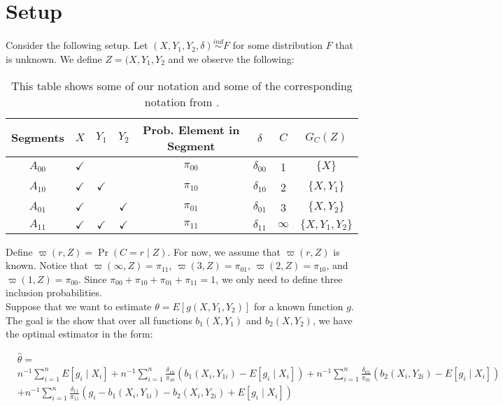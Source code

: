 \documentclass[12pt]{article}
\begin{document}
\rhead{\today}

\section*{Setup}

Consider the following setup. Let $(X, Y_1, Y_2, \delta)  \stackrel{ind}{\sim}
F$ for some distribution $F$ that is unknown. We define $Z = (X, Y_1, Y_2$ and
we observe the following:

\begin{table}[!ht]
  \centering
  \caption{This table shows some of our notation and some of the corresponding
  notation from \cite{tsiatis2006semiparametric}.}
\begin{tabular}{cccccccc}
  \toprule
  Segments & $X$ & $Y_1$ & $Y_2$ & Prob. Element in Segment & $\delta$ & $C$ & $G_C(Z)$ \\
  \midrule
  $A_{00}$ & $\checkmark$ &               &         & $\pi_{00}$ & $\delta_{00}$ & 1 & $\{X\}$ \\
  $A_{10}$ & $\checkmark$ & $\checkmark$  &         & $\pi_{10}$ & $\delta_{10}$ & 2 & $\{X, Y_1\}$ \\
  $A_{01}$ & $\checkmark$ &               & $\checkmark$ & $\pi_{01}$ & $\delta_{01}$ & 3 & $\{X, Y_2\}$ \\
  $A_{11}$ & $\checkmark$ & $\checkmark$  & $\checkmark$ & $\pi_{11}$ & $\delta_{11}$ & $\infty$ & $\{X, Y_1, Y_2\}$ \\
  \bottomrule
\end{tabular}
\end{table}

Define $\varpi(r, Z) = \Pr(C = r \mid Z)$. For now, we assume that $\varpi(r,
Z)$ is known. Notice that $\varpi(\infty, Z) = \pi_11$, $\varpi(3, Z) = \pi_{01}$,
$\varpi(2, Z) = \pi_{10}$, and $\varpi(1, Z) = \pi_{00}$. Since $\pi_{00} +
\pi_{10} + \pi_{01} + \pi_{11} = 1$, we only need to define three inclusion 
probabilities.\\

Suppose that we want to estimate $\theta = E[g(X, Y_1, Y_2)]$ for a known
function $g$. 
The goal is the show that over all functions $b_1(X, Y_1)$ and $b_2(X, Y_2)$,
we have the optimal estimator in the form:

\begin{align}
  &\hat \theta =\\ \nonumber
  &n^{-1} \sum_{i = 1}^n E[g_i \mid X_i] + n^{-1} \sum_{i = 1}^n
  \frac{\delta_{10}}{\pi_{10}} (b_1(X_i, Y_{1i}) - E[g_i \mid X_i]) 
  + n^{-1} \sum_{i = 1}^n \frac{\delta_{01}}{\pi_{01}} (b_2(X_i, Y_{2i}) - E[g_i \mid X_i]) \\ \nonumber
  &+ n^{-1} \sum_{i = 1}^n \frac{\delta_{11}}{\pi_{11}} (g_i - b_1(X_i, Y_{1i}) - b_2(X_i, Y_{2i}) + E[g_i \mid X_i])
\end{align}
\end{document}
